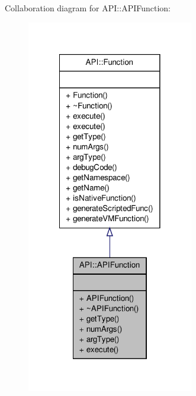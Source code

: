 Collaboration diagram for A\-P\-I\-:\-:A\-P\-I\-Function\-:
\nopagebreak
\begin{figure}[H]
\begin{center}
\leavevmode
\includegraphics[width=206pt]{class_a_p_i_1_1_a_p_i_function__coll__graph}
\end{center}
\end{figure}
